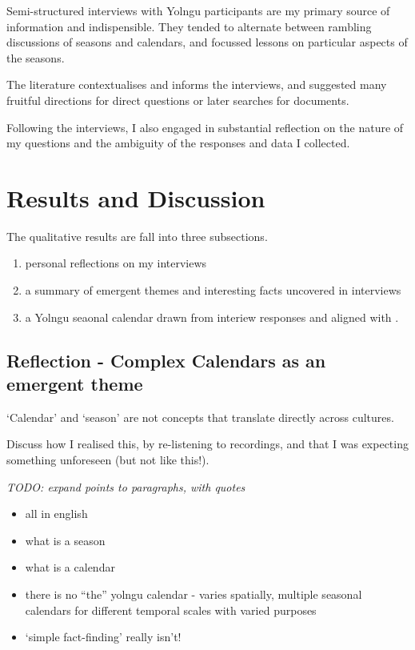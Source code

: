 Semi-structured interviews with Yolngu participants are my primary source of information and indispensible.
They tended to alternate between rambling discussions of seasons and calendars,
and focussed lessons on particular aspects of the seasons.

The literature contextualises and informs the interviews, and suggested many fruitful
directions for direct questions or later searches for documents.

Following the interviews, I also engaged in substantial reflection on the nature of
my questions and the ambiguity of the responses and data I collected.



\section{Results and Discussion}

The qualitative results are fall into three subsections.
\begin{enumerate}
\item personal reflections on my interviews
\item a summary of emergent themes and interesting facts uncovered in interviews
\item a Yolngu seaonal calendar drawn from interiew responses and aligned with \citet{davis1989}.
\end{enumerate}


\subsection{Reflection - Complex Calendars as an emergent theme}

`Calendar' and `season' are not concepts that translate directly across cultures. 

Discuss how I realised this, by re-listening to recordings, and that I was expecting something unforeseen (but not like this!).  

\emph{TODO: expand points to paragraphs, with quotes}

\begin{itemize}
\item all in english
\item what is a season
\item what is a calendar
\item there is no ``the'' yolngu calendar - varies spatially,
        multiple seasonal calendars for different temporal scales with varied purposes
\item `simple fact-finding' really isn't!
\end{itemize}



